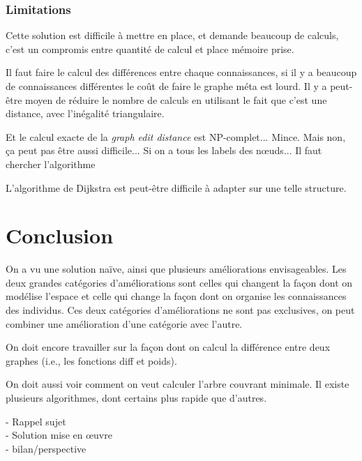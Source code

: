 \documentclass[a4paper]{article}
\newcommand{\comment}{}
\begin{document}
    \subsubsection{Limitations}

Cette solution est difficile à mettre en place, et demande beaucoup de calculs,
c'est un compromis entre quantité de calcul et place mémoire prise.

Il faut faire le calcul des différences entre chaque connaissances, si il y a
beaucoup de connaissances différentes le coût de faire le graphe méta est lourd.
Il y a peut-être moyen de réduire le nombre de calculs en utilisant le fait que
c'est une distance, avec l'inégalité triangulaire.

\comment{Et le calcul exacte de la \emph{graph edit distance} est NP-complet...
Mince. Mais non, ça peut pas être aussi difficile... Si on a tous les labels des
nœuds... Il faut chercher l'algorithme}

L'algorithme de Dijkstra est peut-être difficile à adapter sur une telle
structure.

\section{Conclusion}

On a vu une solution naïve, ainsi que plusieurs améliorations envisageables. Les
deux grandes catégories d'améliorations sont celles qui changent la façon dont
on modélise l'espace et celle qui change la façon dont on organise les
connaissances des individus. Ces deux catégories d'améliorations ne sont pas
exclusives, on peut combiner une amélioration d'une catégorie avec l'autre.

On doit encore travailler sur la façon dont on calcul la différence entre deux
graphes (i.e., les fonctions \gls{diff} et \gls{poids}).

On doit aussi voir comment on veut calculer l'arbre couvrant minimale. Il existe
plusieurs algorithmes, dont certains plus rapide que d'autres.

\comment{- Rappel sujet \\ - Solution mise en œuvre \\ - bilan/perspective}

\printnoidxglossary[sort=def]

 
\end{document}
